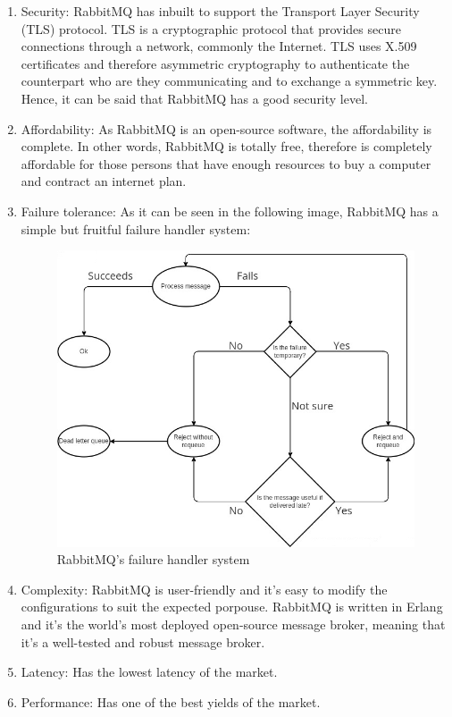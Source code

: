 \documentclass[12pt]{article}
\begin{document}
\begin{enumerate}
    \item Security: RabbitMQ has inbuilt to support the Transport Layer Security (TLS) protocol. TLS is a cryptographic protocol that provides secure connections through a network, commonly the Internet. TLS uses X.509 certificates and therefore asymmetric cryptography to authenticate the counterpart who are they communicating and to exchange a symmetric key. Hence, it can be said that RabbitMQ has a good security level.
    \item Affordability: As RabbitMQ is an open-source software, the affordability is complete. In other words, RabbitMQ is totally free, therefore is completely affordable for those persons that have enough resources to buy a computer and contract an internet plan.
    \item Failure tolerance: As it can be seen in the following image, RabbitMQ has a simple but fruitful failure handler system:
    \begin{figure}[H]
        \centering
        \includegraphics[scale = 2]{Images/fault handling process.jpg}
        \caption{RabbitMQ's failure handler system}
        \label{fig:failure}
    \end{figure}
    \item Complexity: RabbitMQ is user-friendly and it's easy to modify the configurations to suit the expected porpouse. RabbitMQ is written in Erlang and it's the world's most deployed open-source message broker, meaning that it's a well-tested and robust message broker.
    \item Latency: Has the lowest latency of the market.
    \item Performance: Has one of the best yields of the market.
\end{enumerate}
\end{document}
